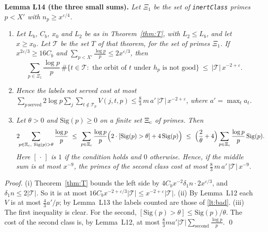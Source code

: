 \documentclass[11pt,letterpaper]{article}
\begin{document}
\textbf{Lemma L14 (the three small sums).} \emph{Let $\Xi_1$ be the set of \texttt{inertClass}
primes $p<X'$ with $n_p\ge x^{\varepsilon/4}$.}
\begin{enumerate}[label=\textup{(\roman*)},leftmargin=2.4em,itemsep=1pt,topsep=2pt]
\item \emph{Let $L_b$, $C_b$, $x_0$ and $L_2$ be as in Theorem~\ref{thm:T}, with $L_2\le L_b$, and let
$x\ge x_0$. Let $\mathcal T$ be the set $T$ of that theorem, for the set of primes $\Xi_1$.
If $x^{2\varepsilon/3}\ge16C_b$ and $\sum_{p<X'}\frac{\log p}p\le2x^{\varepsilon/3}$, then}
\begin{equation}\label{lt:bad}
 \sum_{p\in\Xi_1}\frac{\log p}p\,\#\{t\in\mathcal T:\text{ the orbit of $t$ under $h_p$ is not good}\}
 \ \le\ |\mathcal T|\,x^{-2+\varepsilon}.
\end{equation}
\item \emph{Hence the labels not served cost at most}
$\sum_{p\ \mathrm{served}}2\log p\sum_j\sum_{t\notin\mathcal T_p}V(j,t,p)\le\frac83\,m\,a'\,|\mathcal T|\,x^{-2+\varepsilon}$,
\emph{where $a'=\max_ta_t$.}
\item \emph{Let $\theta>0$ and $\mathrm{Sig}(p)\ge0$ on a finite set $\Xi_{\rm c}$ of primes. Then}
\begin{equation}\label{lt:markov}
 2\!\!\sum_{p\in\Xi_{\rm c},\ \mathrm{Sig}(p)>\theta}\frac{\log p}p\ \le\
 \sum_{p\in\Xi_{\rm c}}\frac{\log p}p\Big(2\cdot[\mathrm{Sig}(p)>\theta]+4\,\mathrm{Sig}(p)\Big)
 \ \le\ \Big(\frac2\theta+4\Big)\sum_{p\in\Xi_{\rm c}}\frac{\log p}p\,\mathrm{Sig}(p).
\end{equation}
\emph{Here $[\,\cdot\,]$ is $1$ if the condition holds and $0$ otherwise. Hence, if the middle sum is at
most $x^{-9}$, the primes of the second class cost at most} $\frac83\,m\,a'\,|\mathcal T|\,x^{-9}$.
\end{enumerate}
\emph{Proof.} (i) Theorem~\ref{thm:T} bounds the left side by
$4C_bx^{-2}\delta_1n\cdot2x^{\varepsilon/3}$, and $\delta_1n\le2|\mathcal T|$. So it is at most
$16C_bx^{-2+\varepsilon/3}|\mathcal T|\le x^{-2+\varepsilon}|\mathcal T|$. (ii) By Lemma~L12 each $V$ is at
most $\frac43a'/p$; by Lemma~L13 the labels counted are those of \eqref{lt:bad}. (iii) The first inequality
is clear. For the second, $[\mathrm{Sig}(p)>\theta]\le\mathrm{Sig}(p)/\theta$. The cost of the second class
is, by Lemma~L12, at most $\frac83ma'|\mathcal T|\sum_{\mathrm{second}}\frac{\log p}p$. \qed
\end{document}

